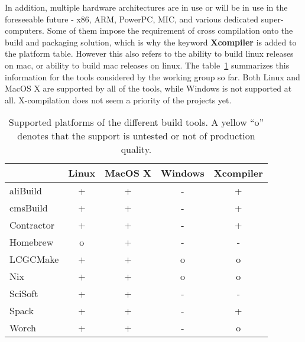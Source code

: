 \documentclass[12pt,a4paper]{article}
\begin{document}
In addition, multiple hardware architectures are in use or will be in use in the foreseeable future - x86, ARM, PowerPC, MIC, and various dedicated super-computers. Some of them impose the requirement of cross compilation onto the build and packaging solution, which is why the keyword \textbf{Xcompiler} is added to the platform table.  However this also refers to the ability to build linux releases on mac, or ability to build mac releases on linux.
The table~\ref{tab:taxonomyPlatforms} summarizes this information for the tools considered by the working group so far. Both Linux and MacOS X are supported by all of the tools, while Windows is not supported at all. X-compilation does not seem a priority of the projects yet.

\begin{table}
\centering
\begin{tabular}{lcccc}
& Linux & MacOS X & Windows & Xcompiler \\ \hline
aliBuild & \cellcolor{green} + & \cellcolor{green} + & \cellcolor{red} - & \cellcolor{green} +  \\
cmsBuild & \cellcolor{green} + & \cellcolor{green} + & \cellcolor{red} - & \cellcolor{green} +  \\
Contractor & \cellcolor{green} + & \cellcolor{green} + & \cellcolor{red} - & \cellcolor{green} + \\
Homebrew & \cellcolor{yellow} o & \cellcolor{green} + & \cellcolor{red} - & \cellcolor{red} -\\
LCGCMake & \cellcolor{green} + & \cellcolor{green} + & \cellcolor{yellow} o   & \cellcolor{yellow} o \\
Nix & \cellcolor{green} + & \cellcolor{green} + & \cellcolor{yellow} o  & \cellcolor{yellow} o \\
SciSoft &  \cellcolor{green} + & \cellcolor{green} + & \cellcolor{red} - & \cellcolor{red} - \\
Spack & \cellcolor{green} + & \cellcolor{green} + & \cellcolor{red} - & \cellcolor{green} +\\
Worch &  \cellcolor{green} + &  \cellcolor{green}  + & \cellcolor{red} -  &  \cellcolor{yellow} o
\end{tabular}
\caption{\label{tab:taxonomyPlatforms}Supported platforms of the different build tools. A yellow ``o'' denotes that the support is untested or not of production quality.}
\end{table}
\end{document}
